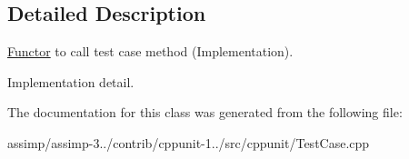 \subsection{Detailed Description}
\hyperlink{class_functor}{Functor} to call test case method (Implementation). 

Implementation detail. 

The documentation for this class was generated from the following file\+:\begin{DoxyCompactItemize}
\item 
assimp/assimp-\/3../contrib/cppunit-\/1../src/cppunit/Test\+Case.\+cpp\end{DoxyCompactItemize}

